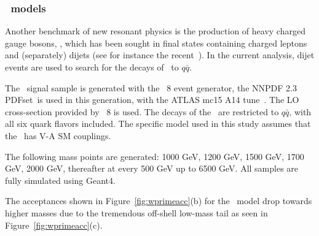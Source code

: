 \clearpage
\subsubsection{\Wprime\ models}
\label{sec:Wprime}

Another benchmark of new resonant physics is the production of heavy charged gauge bosons, \Wprime{}, which
has been sought in final states containing charged leptons and (separately) dijets (see for instance the recent~\cite{EXOT-2013-08}). 
In the current analysis, dijet events are used to search for the decays of \Wprime\  to $q\bar{q}$.

The \Wprime\  signal sample is generated with the \Pythia~8 event generator, the NNPDF 2.3 PDFset~\cite{Carrazza:2013axa}is used in this generation, 
with the ATLAS mc15 A14 tune~\cite{A14tune}. The LO cross-section provided by \Pythia~8 
is used. The decays of the \Wprime\ are restricted to  $q\bar{q}$, with all six quark flavors included. 
The specific model used in this study assumes that the \Wprime\  has V-A SM couplings.

The following mass points are generated: 1000 GeV, 1200 GeV, 1500 GeV, 1700 GeV, 2000 GeV, thereafter at every 500 GeV up to 6500 GeV. 
All samples are fully simulated using Geant4.

The acceptances shown in Figure~\ref{fig:wprimeacc}(b) for the \Wprime\ model
drop towards higher masses due to the tremendous off-shell low-mass 
tail as seen in Figure~\ref{fig:wprimeacc}(c).

